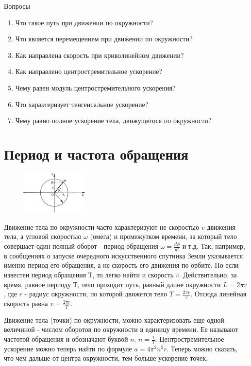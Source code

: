 \documentclass[a6paper, 11pt]{diss_4}
\renewcommand{\'}{\,'}
\begin{document}
\begin{center}
   Вопросы
\end{center}
\begin{enumerate}
\item Что такое путь при движении по окружности?
\item Что является перемещением при движении по окружности?
\item Как направлена скорость при криволинейном движении?
\item Как направлено центростремительное ускорение?
\item Чему равен модуль центростремительного ускорения?
\item Что характеризует тенгенсальное ускорение?
\item Чему равно полное ускорение тела, движущегося по окружности?
\end{enumerate}

\section{Период и частота обращения}

\begin{figure}
\includegraphics[width=0.3\textwidth]{img/img_23.eps}
\caption{}
\label{r63}
\end{figure}
  Движение тела по окружности часто характеризуют не скоростью $v$ движения
тела, а угловой скоростью $\omega$ (омега) и промежутком времени, за который
тело совершает один полный оборот - период обращения
$\omega=\frac{d\phi}{dt}$ и т.д. Так, например, в сообщениях о запуске
очередного искусственного спутника Земли указывается именно период его
обращения, а не скорость его движения по орбите. Но если известен период
обращения $Т$, то легко найти и скорость $v$. Действительно, за время, равное
периоду $Т$, тело проходит путь, равный длине окружности $L=2\pi r$, где $r$
- радиус окружности, по которой движется тело $T=\frac{2\pi r}{v}$. Отсюда
линейная скорость равна $v=\frac{2\pi r}{T}$.

  Движение тела (точки) по окружности, можно характеризовать еще одной
величиной - числом оборотов по окружности в единицу времени. Ее называют
частотой обращения и обозначают буквой $n$. $n=\frac{1}{T}$.
Центростремительное ускорение можно теперь найти по формуле $a=4\pi^2 n^2 r$.
Теперь можно сказать, что чем дальше от центра окружности, тем больше
ускорение точек.
\end{document}
